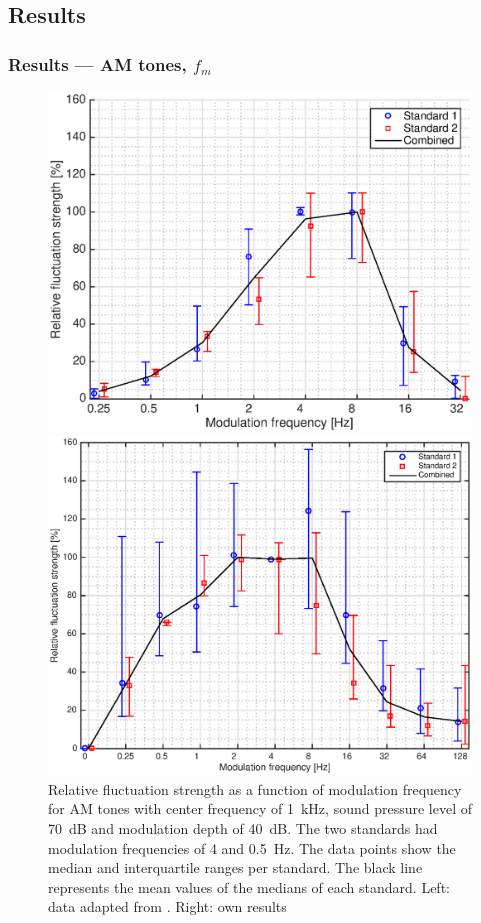 \documentclass{beamer}
\begin{document}
\subsection{Results}
\begin{frame}
  \frametitle{Results --- AM tones, $f_m$}
  \begin{figure}
    \centering
    \begin{minipage}{0.45\textwidth}
      \includegraphics[width=\textwidth]{fastl2007_am-fm}
    \end{minipage}
    \hfill
    \begin{minipage}{0.45\textwidth}
      \includegraphics[width=\textwidth]{AM-fm_all_standards}
    \end{minipage}
    \caption{Relative fluctuation strength as a function of modulation frequency
    for AM tones with center frequency of 1~kHz, sound pressure level of
    70~dB and modulation depth of 40~dB.  The two standards had modulation
    frequencies of 4 and 0.5~Hz. The data points show the median and
    interquartile ranges per standard. The black line represents the mean values
    of the medians of each standard. Left: data adapted from
    \citeauthor[pp.248]{Fastl2007Psychoacoustics}. Right: own results}
  \end{figure}
\end{frame}
\end{document}
